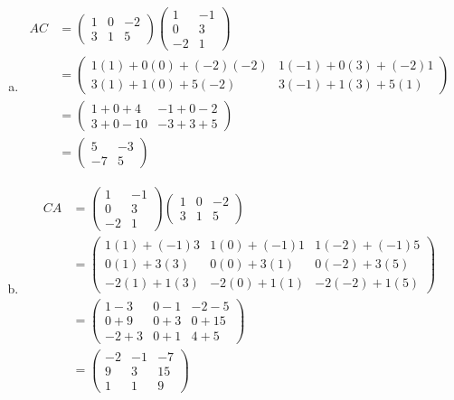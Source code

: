 \documentclass[11pt,letterpaper]{article}
\begin{document}
\begin{enumerate}[(a)]
\item 
	\[
	\begin{aligned}
	AC&= \begin{pmatrix} 1 & 0 & -2 \\ 3 & 1 & 5 \end{pmatrix} \begin{pmatrix} 1 & -1 \\ 0 & 3 \\ -2 & 1 \end{pmatrix} \\
	&= \begin{pmatrix} 1(1) + 0(0) + (-2)(-2) & 1(-1) + 0(3) + (-2)1 \\ 3(1) + 1(0) + 5(-2) & 3(-1) + 1(3) + 5(1) \end{pmatrix} \\
	&= \begin{pmatrix} 1 + 0 + 4 & -1 + 0 - 2 \\ 3 + 0 - 10 & -3 + 3 + 5 \end{pmatrix} \\
	&= \begin{pmatrix} 5 & -3 \\ -7 & 5 \end{pmatrix}
	\end{aligned}
	\] \pspace

\item  
	\[
	\begin{aligned}
	CA&= \begin{pmatrix} 1 & -1 \\ 0 & 3 \\ -2 & 1 \end{pmatrix} \begin{pmatrix} 1 & 0 & -2 \\ 3 & 1 & 5 \end{pmatrix} \\
	&= \begin{pmatrix} 1(1) + (-1)3 & 1(0) + (-1)1 & 1(-2) + (-1)5 \\ 0(1) + 3(3) & 0(0) + 3(1) & 0(-2) + 3(5) \\ -2(1) + 1(3) & -2(0) + 1(1) & -2(-2) + 1(5) \end{pmatrix} \\
	&= \begin{pmatrix} 1 - 3 & 0 - 1 & -2 - 5 \\ 0 + 9 & 0 + 3 & 0 + 15 \\ -2 + 3 & 0 + 1 & 4 + 5 \end{pmatrix} \\
	&= \begin{pmatrix} -2 & -1 & -7 \\ 9 & 3 & 15 \\ 1 & 1 & 9 \end{pmatrix}
	\end{aligned}
	\]
\end{enumerate}
\end{document}
